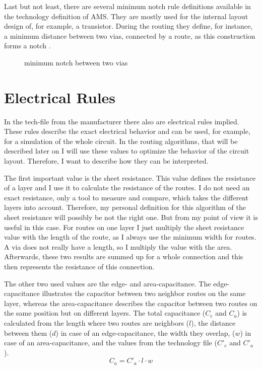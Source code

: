 Last but not least, there are several minimum notch rule definitions available in the technology definition of AMS. They are mostly used for the internal layout design of, for example, a transistor. During the routing they define, for instance, a minimum distance between two vias, connected by a route, as this construction forms a notch .

\begin{figure}
	\centering
	
	\caption{minimum notch between two vias}
	\label{fig:technology_rule_notch}
\end{figure}

\section{Electrical Rules}
\label{sec:electrical_rules}
In the tech-file from the manufacturer there also are electrical rules implied. These rules describe the exact electrical behavior and can be used, for example, for a simulation of the whole circuit. In the routing algorithms, that will be described later on  I will use these values to optimize the behavior of the circuit layout. Therefore, I want to describe how they can be interpreted.

The first important value is the sheet resistance. This value defines the resistance of a layer and I use it to calculate the resistance of the routes. I do not need an exact resistance, only a tool to measure and compare, which takes the different layers into account. Therefore, my personal definition for this algorithm of the sheet resistance will possibly be not the right one. But from my point of view it is useful in this case. For routes on one layer I just multiply the sheet resistance value with the length of the route, as I always use the minimum width for routes. A via does not really have a length, so I multiply the value with the area. Afterwards, these two results are summed up for a whole connection and this then represents the resistance of this connection.

The other two used values are the edge- and area-capacitance. The edge-capacitance illustrates the capacitor between two neighbor routes on the same layer, whereas the area-capacitance describes the capacitor between two routes on the same position but on different layers. The total capacitance ($C_e$ and $C_a$) is calculated from the length where two routes are neighbors ($l$), the distance between them ($d$) in case of an edge-capacitance, the width they overlap, ($w$) in case of an area-capacitance, and the values from the technology file ($C'_e$ and $C'_a$).
\begin{equation}
	\label{eq:area_capacitance}
	C_a = C'_a \cdot l \cdot w
\end{equation}

